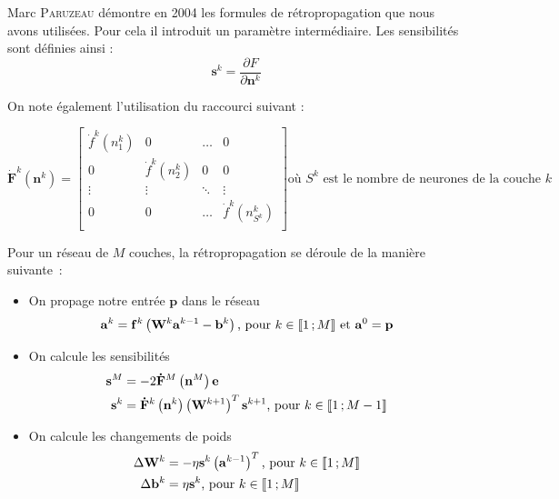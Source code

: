 Marc \textsc{Paruzeau} démontre en 2004 les formules de rétropropagation que nous avons utilisées. Pour cela il introduit un paramètre %
intermédiaire. Les sensibilités sont définies ainsi :
\begin{equation}
 \mathbf{s}^k = \frac{\partial F}{\partial \mathbf{n}^k}
\end{equation}

On note également l'utilisation du raccourci suivant : 

\begin{equation}
  \displaystyle
 \mathbf{\dot F}^k\left(\mathbf{n}^k\right) =
 \begin{bmatrix}
  \dot f ^k\left(n^k_1\right) & 0 & \ldots & 0\\
  0 & \dot f^k\left(n^k_2\right) & 0 & 0\\
  \vdots & \vdots & \ddots & \vdots \\
  0 & 0 & \ldots & \dot f^k\left(n^k_{S^k}\right)\\
 \end{bmatrix}
 \text{où $S^k$ est le nombre de neurones de la couche $k$}
\end{equation}

Pour un réseau de $M$ couches, la rétropropagation se déroule de la manière suivante~:
\begin{itemize}
 \item On propage notre entrée $\mathbf{p}$ dans le réseau
 \begin{equation}
   \mathbf{a}^k = \mathbf{f}^k\left(\mathbf{W}^k\mathbf{a}^{k-1} - \mathbf{b}^k\right) \text{, pour $k \in \mathopen{\llbracket}1\,;M\mathclose{\rrbracket}$ et $\mathbf{a}^0 = \mathbf{p}$}
 \end{equation}
 
 \item On calcule les sensibilités 
 \begin{align}
  \mathbf{s}^M &= -2\mathbf{\dot F}^M\left(\mathbf{n}^M\right)\mathbf{e} \\
  \mathbf{s}^k &= \mathbf{\dot F}^k\left(\mathbf{n}^k\right)\left(\mathbf{W}^{k+1}\right)^T \mathbf{s}^{k+1} \text{, pour $k \in \mathopen{\llbracket}1\,;M-1\mathclose{\rrbracket}$}
 \end{align}
 
 \item On calcule les changements de poids
 \begin{align}
  \Delta \mathbf{W}^k &= - \eta \mathbf{s}^k\left(\mathbf{a}^{k-1}\right)^T \text{, pour $k \in \mathopen{\llbracket}1\,;M\mathclose{\rrbracket}$} \\
  \Delta \mathbf{b}^k &= \eta \mathbf{s}^k \text{, pour $k \in \mathopen{\llbracket}1\,;M\mathclose{\rrbracket}$}
 \end{align}

\end{itemize}

